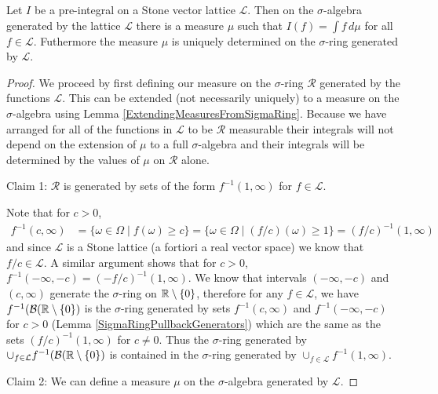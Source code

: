 \begin{thm}\label{DaniellStoneTheorem}Let $I$ be a pre-integral on a Stone vector lattice
  $\mathcal{L}$.  Then on the $\sigma$-algebra generated by the
  lattice $\mathcal{L}$ there is a measure $\mu$ such that $I(f) =
  \int f \, d\mu$ for all $f \in \mathcal{L}$.  Futhermore the measure
  $\mu$ is uniquely determined on the $\sigma$-ring generated by $\mathcal{L}$.
\end{thm}
\begin{proof}
We proceed by first defining our measure on the $\sigma$-ring
$\mathcal{R}$ generated by the functions $\mathcal{L}$.  This can be extended (not
necessarily uniquely) to a measure on the $\sigma$-algebra using Lemma \ref{ExtendingMeasuresFromSigmaRing}.
Because we have arranged for all of the functions in $\mathcal{L}$ to
be $\mathcal{R}$ measurable their integrals will not depend on the
extension of $\mu$ to a full $\sigma$-algebra and their integrals will
be determined by the values of $\mu$ on $\mathcal{R}$ alone.

Claim 1: $\mathcal{R}$ is generated by sets of the form $f^{-1}(1,
\infty)$ for $f \in \mathcal{L}$.

Note that for $c > 0$, 
\begin{align*}
f^{-1}(c, \infty) &= 
\lbrace \omega \in \Omega \mid f(\omega) \geq c \rbrace = 
\lbrace \omega \in \Omega \mid \left(f/c\right)(\omega) \geq 1 \rbrace =
\left(f/c\right)^{-1}(1, \infty)
\end{align*}
and since $\mathcal{L}$ is a Stone lattice (a fortiori a real vector
space) we know that $f/c \in \mathcal{L}$.  A similar argument
shows that for $c > 0$, $f^{-1}(-\infty, -c) = (-f/c)^{-1}(1,
\infty)$.  We know that intervals $(-\infty, -c)$ and $(c, \infty)$
generate the $\sigma$-ring on $\mathbb{R} \setminus \lbrace 0 \rbrace$,
therefore for any $f \in \mathcal{L}$, we have
$f^{-1}(\mathcal{B}(\mathbb{R}\setminus \lbrace 0 \rbrace)$ is the
$\sigma$-ring generated by sets $f^{-1}(c, \infty)$ and
$f^{-1}(-\infty, -c)$ for $c > 0$
(Lemma \ref{SigmaRingPullbackGenerators}) which are the same as the sets
$(f/c)^{-1}(1, \infty)$ for $c \neq 0$. Thus the $\sigma$-ring generated by $\cup_{f
  \in \mathcal{L}} f^{-1}(\mathcal{B}(\mathbb{R}\setminus \lbrace 0
\rbrace)$ is contained in the $\sigma$-ring generated by $\cup_{f \in
  \mathcal{L}} f^{-1}(1, \infty)$.

Claim 2: We can define a measure $\mu$ on the $\sigma$-algebra
generated by $\mathcal{L}$.


\end{proof}
